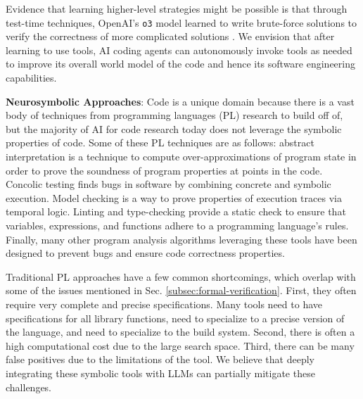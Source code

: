 

Evidence that learning higher-level strategies might be possible is that through test-time techniques, OpenAI's \texttt{o3} model learned to write brute-force solutions to verify the correctness of more complicated solutions \citep{el2025competitive}. We envision that after learning to use tools, AI coding agents can autonomously invoke tools as needed to improve its overall world model of the code and hence its software engineering capabilities.

\textbf{Neurosymbolic Approaches}: Code is a unique domain because there is a vast body of techniques from programming languages (PL) research to build off of, but the majority of AI for code research today does not leverage the symbolic properties of code. Some of these PL techniques are as follows: abstract interpretation \citep{cousot1977abstract} is a technique to compute over-approximations of program state in order to prove the soundness of program properties at points in the code. Concolic testing \citep{godefroid2005dart, sen2005cute} finds bugs in software by combining concrete and symbolic execution. Model checking \citep{clarke1997model} is a way to prove properties of execution traces via temporal logic. Linting and type-checking \citep{cardelli1996type} provide a static check to ensure that variables, expressions, and functions adhere to a programming language's rules. Finally, many other program analysis algorithms leveraging these tools have been designed to prevent bugs and ensure code correctness properties.

Traditional PL approaches have a few common shortcomings, which overlap with some of the issues mentioned in Sec. \ref{subsec:formal-verification}. First, they often require very complete and precise specifications. Many tools need to have specifications for all library functions, need to specialize to a precise version of the language, and need to specialize to the build system. Second, there is often a high computational cost due to the large search space. Third, there can be many false positives due to the limitations of the tool. We believe that deeply integrating these symbolic tools with LLMs can partially mitigate these challenges. 

